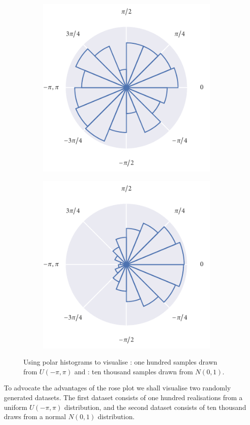 \begin{figure}[tb]
	\begin{subfigure}[b]{0.45\textwidth}
		\includegraphics{uniform_polar_hist.pdf}
		\caption{}
		\label{subfig:unif_angle_rose}
	\end{subfigure}%
	\hspace{0.05\textwidth}%
	\begin{subfigure}[b]{0.45\textwidth}
		\includegraphics{normal_polar_hist.pdf}
		\caption{}
		\label{subfig:norm_angle_rose}
	\end{subfigure}
    \caption{Using polar histograms to visualise
      : one hundred samples drawn from $U(-\pi,
      \pi)$ and : ten thousand samples drawn from
      $N(0, 1)$.}
    \label{fig:angle_rose}
\end{figure}
To advocate the advantages of the rose plot we shall visualise two randomly
generated datasets. The first dataset consists of one hundred realisations from
a uniform $U(-\pi,\pi)$ distribution, and the second dataset consists of ten
thousand draws from a normal $N(0, 1)$ distribution.

